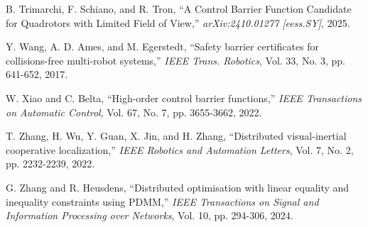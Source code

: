 \begin{thebibliography}{99}
 B. Trimarchi, F. Schiano, and R. Tron, ``A Control Barrier Function Candidate for Quadrotors with Limited Field of View,'' {\it arXiv:2410.01277 [eess.SY]}, 2025.

 Y. Wang, A. D. Ames, and M. Egerstedt, ``Safety barrier certificates for collisions-free multi-robot systems,'' {\it IEEE Trans. Robotics}, Vol. 33, No. 3, pp. 641-652, 2017.

 W. Xiao and C. Belta, ``High-order control barrier functions,'' {\it IEEE Transactions on Automatic Control}, Vol. 67, No. 7, pp. 3655-3662, 2022.

 T. Zhang, H. Wu, Y. Guan, X. Jin, and H. Zhang, ``Distributed visual-inertial cooperative localization,'' {\it IEEE Robotics and Automation Letters}, Vol. 7, No. 2, pp. 2232-2239, 2022.

 G. Zhang and R. Heusdens, ``Distributed optimisation with linear equality and inequality constraints using PDMM,'' {\it IEEE Transactions on Signal and Information Processing over Networks}, Vol. 10, pp. 294-306, 2024.
\end{thebibliography}
